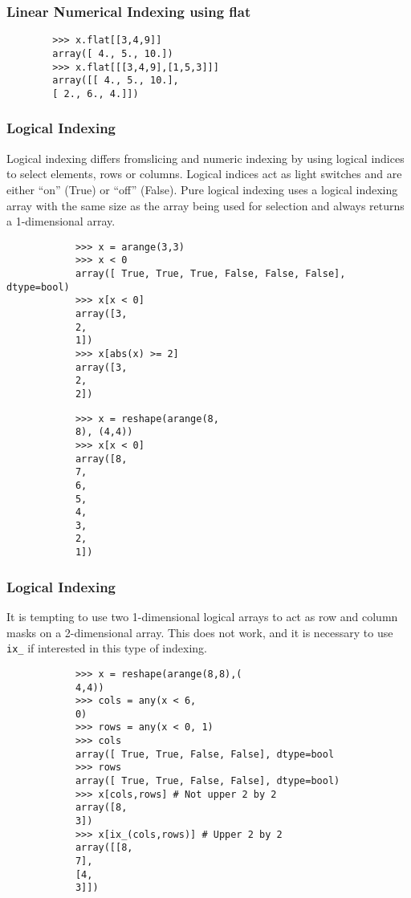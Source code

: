 \documentclass[KSmainSlides.tex]{subfiles}
\begin{document}
\begin{frame}[fragile]	
	\frametitle*{Linear Numerical Indexing using flat}
	\begin{framed}
		\begin{verbatim}
		>>> x.flat[[3,4,9]]
		array([ 4., 5., 10.])
		>>> x.flat[[[3,4,9],[1,5,3]]]
		array([[ 4., 5., 10.],
		[ 2., 6., 4.]])
		\end{verbatim}
	\end{framed}
\end{frame}	
	\begin{frame}
		\frametitle{Logical Indexing}
		Logical indexing differs fromslicing and numeric indexing by using logical indices to select elements, rows
		or columns. Logical indices act as light switches and are either “on” (True) or “off” (False). Pure logical
		indexing uses a logical indexing array with the same size as the array being used for selection and always
		returns a 1-dimensional array.
\end{frame}			
\begin{frame}[fragile]
		\begin{framed}
			\begin{verbatim}
			>>> x = arange(3,3)
			>>> x < 0
			array([ True, True, True, False, False, False], dtype=bool)
			>>> x[x < 0]
			array([3,
			2,
			1])
			>>> x[abs(x) >= 2]
			array([3,
			2,
			2])
			\end{verbatim}
			\end{framed}
	\end{frame}			
	\begin{frame}[fragile]
			\begin{framed}
				\begin{verbatim}
			>>> x = reshape(arange(8,
			8), (4,4))
			>>> x[x < 0]
			array([8,
			7,
			6,
			5,
			4,
			3,
			2,
			1])
			\end{verbatim}
		\end{framed}
	\end{frame}
	\begin{frame}[fragile]	
		\frametitle{Logical Indexing}
		It is tempting to use two 1-dimensional logical arrays to act as row and column masks on a 2-dimensional
		array. This does not work, and it is necessary to use \texttt{ix\_} if interested in this type of indexing.
		\begin{framed}
			\begin{verbatim}
			>>> x = reshape(arange(8,8),(
			4,4))
			>>> cols = any(x < 6,
			0)
			>>> rows = any(x < 0, 1)
			>>> cols
			array([ True, True, False, False], dtype=bool
			>>> rows
			array([ True, True, False, False], dtype=bool)
			>>> x[cols,rows] # Not upper 2 by 2
			array([8,
			3])
			>>> x[ix_(cols,rows)] # Upper 2 by 2
			array([[8,
			7],
			[4,
			3]])
			\end{verbatim}
		\end{framed}
	\end{frame}
\end{document}
